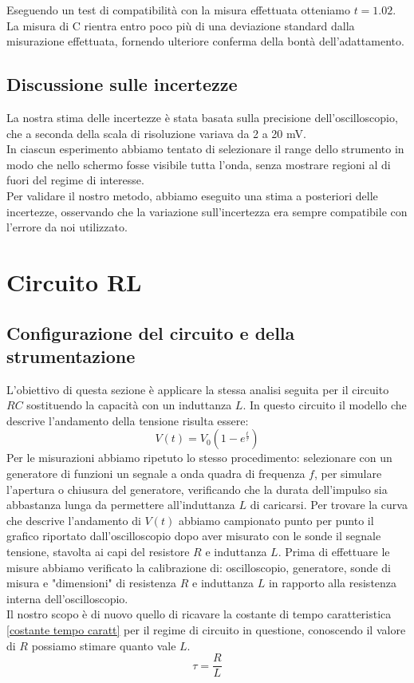 \documentclass[letterpaper,12pt]{article}
\begin{document}
Eseguendo un test di compatibilità con la misura effettuata otteniamo $t = 1.02$. \\

La misura di C rientra entro poco più di una deviazione standard dalla misurazione effettuata, fornendo ulteriore conferma della bontà dell'adattamento.

\subsection{Discussione sulle incertezze}

La nostra stima delle incertezze è stata basata sulla precisione dell'oscilloscopio, che a seconda della scala di risoluzione variava da 2 a 20 mV. \\
In ciascun esperimento abbiamo tentato di selezionare il range dello strumento in modo che nello schermo fosse visibile tutta l'onda, senza mostrare regioni al di fuori del regime di interesse.\\
Per validare il nostro metodo, abbiamo eseguito una stima a posteriori delle incertezze, osservando che la variazione sull'incertezza era sempre compatibile con l'errore da noi utilizzato.
\newpage
\section{Circuito RL}

\subsection{Configurazione del circuito e della strumentazione}
L'obiettivo di questa sezione è applicare la stessa analisi seguita per il circuito $RC$ sostituendo la capacità con un induttanza $L$.
In questo circuito il modello che descrive l'andamento della tensione risulta essere:
\begin{equation}
	V(t) = V_0 \left(1  -e^{\frac{t}{\tau}}\right)
\end{equation}
Per le misurazioni abbiamo ripetuto lo stesso procedimento: selezionare con un generatore di funzioni un segnale a onda quadra di frequenza $f$, per simulare l'apertura o chiusura del generatore, verificando che la durata dell'impulso sia abbastanza lunga da permettere all'induttanza $L$ di caricarsi.
Per trovare la curva che descrive l'andamento di $V(t)$ abbiamo campionato punto per punto il grafico riportato dall'oscilloscopio dopo aver misurato con le sonde il segnale tensione, stavolta ai capi del resistore $R$ e induttanza $L$. Prima di effettuare le misure abbiamo verificato la calibrazione di: oscilloscopio, generatore, sonde di misura e "dimensioni" di resistenza $R$ e induttanza $L$ in rapporto alla resistenza interna dell'oscilloscopio.\\
Il nostro scopo è di nuovo quello di ricavare la costante di tempo caratteristica \ref{costante tempo caratt} per il regime di circuito in questione, conoscendo il valore di $R$ possiamo stimare quanto vale $L$.
\begin{equation}
	\tau = \frac{R}{L}
	\label{costante tempo caratt}
\end{equation}
\newpage
\end{document}
